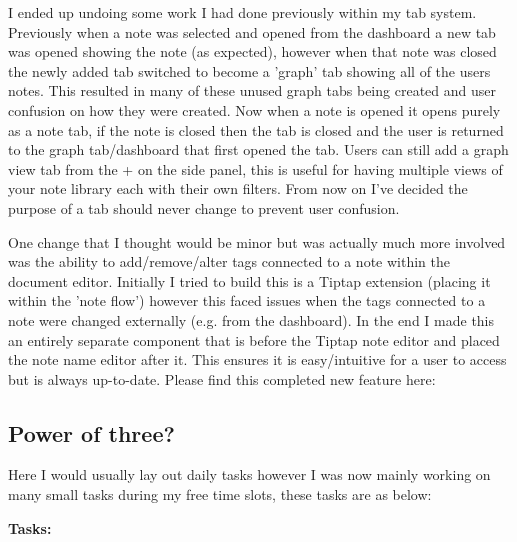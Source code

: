 I ended up undoing some work I had done previously within my tab system. Previously when a note was selected and opened from the dashboard a new tab was opened showing the note (as expected), however when that note was closed the newly added tab switched to become a 'graph' tab showing all of the users notes. This resulted in many of these unused graph tabs being created and user confusion on how they were created. Now when a note is opened it opens purely as a note tab, if the note is closed then the tab is closed and the user is returned to the graph tab/dashboard that first opened the tab. Users can still add a graph view tab from the + on the side panel, this is useful for having multiple views of your note library each with their own filters. From now on I've decided the purpose of a tab should never change to prevent user confusion.

One change that I thought would be minor but was actually much more involved was the ability to add/remove/alter tags connected to a note within the document editor. Initially I tried to build this is a Tiptap extension (placing it within the 'note flow') however this faced issues when the tags connected to a note were changed externally (e.g. from the dashboard). In the end I made this an entirely separate component that is before the Tiptap note editor and placed the note name editor after it. This ensures it is easy/intuitive for a user to access but is always up-to-date. Please find this completed new feature here: 

\subsection*{Power of three?}
Here I would usually lay out daily tasks however I was now mainly working on many small tasks during my free time slots, these tasks are as below:

\textbf{Tasks:}

